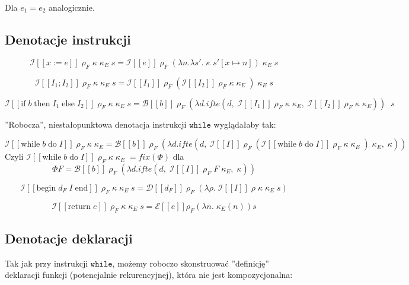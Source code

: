 \documentclass[a4paper]{article}
\begin{document}
Dla $e_1 = e_2$ analogicznie.

\subsection*{Denotacje instrukcji}

$$
\mathcal{I}[\![ x := e ]\!] \; \rho_F \; \kappa \; \kappa_E \; s = \mathcal{I}[\![ e ]\!] \; \rho_F \; (\lambda n. \lambda s'. \; \kappa \; s'[x \mapsto n]) \; \kappa_E \; s
$$

$$
\mathcal{I}[\![ I_1; I_2 ]\!] \; \rho_F \; \kappa \; \kappa_E \; s = \mathcal{I}[\![ I_1 ]\!] \; \rho_F \; (
\mathcal{I}[\![ I_2 ]\!] \; \rho_F \; \kappa \; \kappa_E \;
) \; \kappa_E \; s
$$

$$
\mathcal{I}[\![ \text{if} \; b \; \text{then} \; I_1 \; \text{else} \; I_2 ]\!] \; \rho_F \; \kappa \; \kappa_E \; s = \mathcal{B}[\![ b ]\!] \; \rho_F \; (\lambda d. ifte (d, \;
\mathcal{I}[\![ I_1 ]\!] \; \rho_F \; \kappa \; \kappa_E
, \; 
\mathcal{I}[\![ I_2 ]\!] \; \rho_F \; \kappa \; \kappa_E
)) \; \; s
$$

''Robocza'', niestałopunktowa denotacja instrukcji $\texttt{while}$ wyglądałaby tak:

$$
\mathcal{I}[\![ \text{while} \; b \; \text{do} \; I  ]\!] \; \rho_F \; \kappa \; \kappa_E = \mathcal{B}[\![ b ]\!] \; \rho_F \; (\lambda d. ifte (d, \;
\mathcal{I}[\![ I ]\!] \; \rho_F \; (
\mathcal{I}[\![ \text{while} \; b \; \text{do} \; I ]\!] \; \rho_F \; \kappa \; \kappa_E \;
) \; \kappa_E
, \; 
\kappa
))
$$
Czyli $\mathcal{I}[\![ \text{while} \; b \; \text{do} \; I  ]\!] \; \rho_F \; \kappa \; \kappa_E \; = fix(\Phi)$ dla
$$
\Phi F = \mathcal{B}[\![ b ]\!] \; \rho_F \; (\lambda d. ifte (d, \;
\mathcal{I}[\![ I ]\!] \; \rho_F \; F \; \kappa_E
, \; 
\kappa
))
$$

$$
\mathcal{I}[\![ \text{begin} \; d_F \; I \; \text{end} ]\!] \; \rho_F \; \kappa \; \kappa_E \; s = 
\mathcal{D}[\![ d_F ]\!] \; \rho_F \; (\lambda \rho. \;
\mathcal{I}[\![ I ]\!] \; \rho \; \kappa \; \kappa_E \; s )
$$

$$
\mathcal{I}[\![ \text{return} \; e ]\!] \; \rho_F \; \kappa \; \kappa_E \; s = 
 \mathcal{E}[\![e]\!] \rho_F (\lambda n. \; \kappa_E(n)) s

$$


\subsection*{Denotacje deklaracji}


Tak jak przy instrukcji $\texttt{while}$, możemy roboczo skonstruować  ''definicję'' deklaracji funkcji (potencjalnie rekurencyjnej), która nie jest kompozycjonalna:
\end{document}
